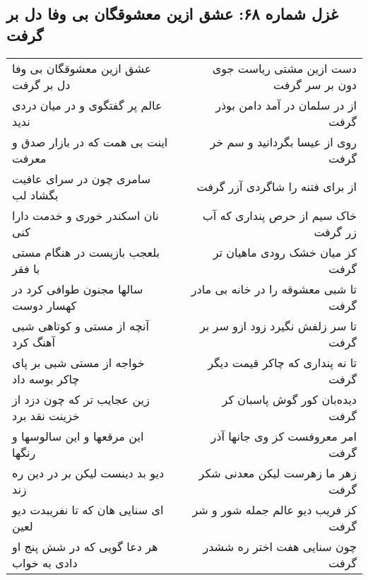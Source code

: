 \begin{center}
\section*{غزل شماره ۶۸: عشق ازین معشوقگان بی وفا دل بر گرفت}
\label{sec:068}
\begin{longtable}{l p{0.5cm} r}
عشق ازین معشوقگان بی وفا دل بر گرفت
&&
دست ازین مشتی ریاست جوی دون بر سر گرفت
\\
عالم پر گفتگوی و در میان دردی ندید
&&
از در سلمان در آمد دامن بوذر گرفت
\\
اینت بی همت که در بازار صدق و معرفت
&&
روی از عیسا بگردانید و سم خر گرفت
\\
سامری چون در سرای عافیت بگشاد لب
&&
از برای فتنه را شاگردی آزر گرفت
\\
نان اسکندر خوری و خدمت دارا کنی
&&
خاک سیم از حرص پنداری که آب زر گرفت
\\
بلعجب بازیست در هنگام مستی با فقر
&&
کز میان خشک رودی ماهیان تر گرفت
\\
سالها مجنون طوافی کرد در کهسار دوست
&&
تا شبی معشوقه را در خانه بی مادر گرفت
\\
آنچه از مستی و کوتاهی شبی آهنگ کرد
&&
تا سر زلفش نگیرد زود ازو سر بر گرفت
\\
خواجه از مستی شبی بر پای چاکر بوسه داد
&&
تا نه پنداری که چاکر قیمت دیگر گرفت
\\
زین عجایب تر که چون دزد از خزینت نقد برد
&&
دیده‌بان کور گوش پاسبان کر گرفت
\\
این مرقعها و این سالوسها و رنگها
&&
امر معروفست کز وی جانها آذر گرفت
\\
دیو بد دینست لیکن بر در دین ره زند
&&
زهر ما زهرست لیکن معدنی شکر گرفت
\\
ای سنایی هان که تا نفریبدت دیو لعین
&&
کز فریب دیو عالم جمله شور و شر گرفت
\\
هر دعا گویی که در شش پنج او دادی به خواب
&&
چون سنایی هفت اختر ره ششدر گرفت
\\
\end{longtable}
\end{center}
